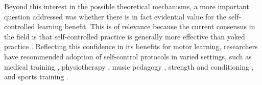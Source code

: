 \documentclass[man,floatsintext,hidelinks]{apa7}
\begin{document}

Beyond this interest in the possible theoretical mechanisms, a more important question addressed was whether there is in fact evidential value for the self-controlled learning benefit. This is of relevance because the current consensus in the field is that self-controlled practice is generally more effective than yoked practice \parencite[for reviews see][]{Sanli2013-xn,Ste-Marie2019-bw,Wulf2016-gf}. Reflecting this confidence in its benefits for motor learning, researchers have recommended adoption of self-control protocols in varied settings, such as medical training \parencite{Brydges2009-zb,Jowett2007-et,Wulf2010-uw}, physiotherapy \parencite{Hemayattalab2013-mq,Wulf2007-nc}, music pedagogy \parencite{Wulf2008-de}, strength and conditioning \parencite{Halperin2018-rs}, and sports training \parencite{Janelle1995-rj,Sigrist2013-ux}.
\end{document}
